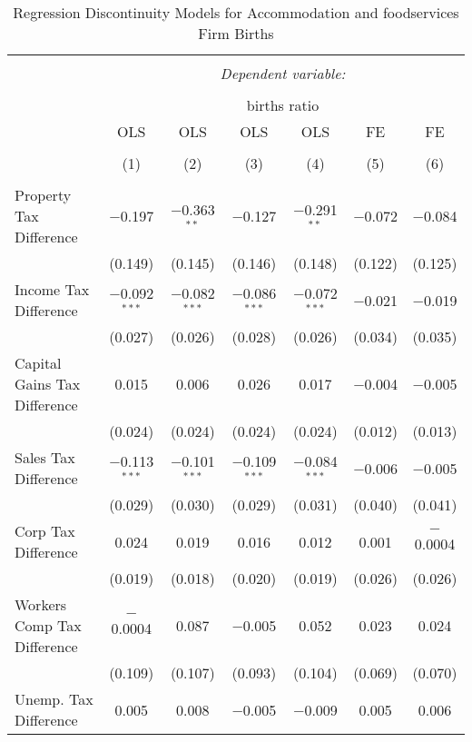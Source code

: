
\begin{table}[!htbp] \centering 
  \caption{Regression Discontinuity Models for  Accommodation and foodservices Firm Births} 
  \label{72rd} 
\footnotesize 
\begin{tabular}{@{\extracolsep{5pt}}lcccccc} 
\\[-1.8ex]\hline 
\hline \\[-1.8ex] 
 & \multicolumn{6}{c}{\textit{Dependent variable:}} \\ 
\cline{2-7} 
\\[-1.8ex] & \multicolumn{6}{c}{births ratio} \\ 
 & OLS & OLS & OLS & OLS & FE & FE \\ 
\\[-1.8ex] & (1) & (2) & (3) & (4) & (5) & (6)\\ 
\hline \\[-1.8ex] 
 Property Tax Difference & $-$0.197 & $-$0.363$^{**}$ & $-$0.127 & $-$0.291$^{**}$ & $-$0.072 & $-$0.084 \\ 
  & (0.149) & (0.145) & (0.146) & (0.148) & (0.122) & (0.125) \\ 
  Income Tax Difference & $-$0.092$^{***}$ & $-$0.082$^{***}$ & $-$0.086$^{***}$ & $-$0.072$^{***}$ & $-$0.021 & $-$0.019 \\ 
  & (0.027) & (0.026) & (0.028) & (0.026) & (0.034) & (0.035) \\ 
  Capital Gains Tax Difference & 0.015 & 0.006 & 0.026 & 0.017 & $-$0.004 & $-$0.005 \\ 
  & (0.024) & (0.024) & (0.024) & (0.024) & (0.012) & (0.013) \\ 
  Sales Tax Difference & $-$0.113$^{***}$ & $-$0.101$^{***}$ & $-$0.109$^{***}$ & $-$0.084$^{***}$ & $-$0.006 & $-$0.005 \\ 
  & (0.029) & (0.030) & (0.029) & (0.031) & (0.040) & (0.041) \\ 
  Corp Tax Difference & 0.024 & 0.019 & 0.016 & 0.012 & 0.001 & $-$0.0004 \\ 
  & (0.019) & (0.018) & (0.020) & (0.019) & (0.026) & (0.026) \\ 
  Workers Comp Tax Difference & $-$0.0004 & 0.087 & $-$0.005 & 0.052 & 0.023 & 0.024 \\ 
  & (0.109) & (0.107) & (0.093) & (0.104) & (0.069) & (0.070) \\ 
  Unemp. Tax Difference & 0.005 & 0.008 & $-$0.005 & $-$0.009 & 0.005 & 0.006 \\ 

\end{tabular}
\end{table}
